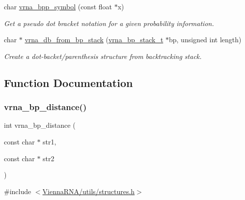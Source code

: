 \begin{DoxyCompactItemize}
\mbox{\label{group__struct__utils_ga025bff1b27fa46534c8fae6980f64bb5}} 
char \hyperlink{group__struct__utils_ga025bff1b27fa46534c8fae6980f64bb5}{vrna\+\_\+bpp\+\_\+symbol} (const float $\ast$x)
\begin{DoxyCompactList}\small\item\em Get a pseudo dot bracket notation for a given probability information. \end{DoxyCompactList}\item 
char $\ast$ \hyperlink{group__struct__utils_ga27bea2c241564af53a065982183389df}{vrna\+\_\+db\+\_\+from\+\_\+bp\+\_\+stack} (\hyperlink{group__data__structures_gaa651bda42e7692f08cb603cd6834b0ee}{vrna\+\_\+bp\+\_\+stack\+\_\+t} $\ast$bp, unsigned int length)
\begin{DoxyCompactList}\small\item\em Create a dot-\/backet/parenthesis structure from backtracking stack. \end{DoxyCompactList}\end{DoxyCompactItemize}


\subsection{Function Documentation}
\mbox{\label{group__struct__utils_ga65bdfbac6a16bf30286e8a3f7d15f60a}} 
\subsubsection{\texorpdfstring{vrna\+\_\+bp\+\_\+distance()}{vrna\_bp\_distance()}}
{\footnotesize\ttfamily int vrna\+\_\+bp\+\_\+distance (\begin{DoxyParamCaption}\item[{const char $\ast$}]{str1,  }\item[{const char $\ast$}]{str2 }\end{DoxyParamCaption})}



{\ttfamily \#include $<$\hyperlink{utils_2structures_8h}{Vienna\+R\+N\+A/utils/structures.\+h}$>$}



